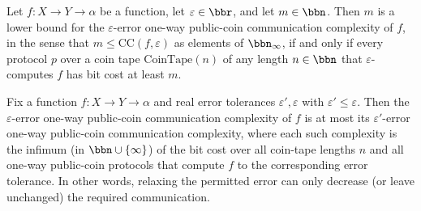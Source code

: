 \begin{theorem}
\label{CommunicationComplexity.PublicCoin.OneWay.le_communicationComplexity_iff}
\leanok
{}
Let $f : X \to Y \to \alpha$ be a function, let $\varepsilon \in \bbr$, and let $m \in
\bbn$. Then $m$ is a lower bound for the $\varepsilon$-error one-way public-coin
communication complexity of $f$, in the sense that $m \le \mathrm{CC}(f,\varepsilon)$ as
elements of $\bbn_\infty$, if and only if every protocol $p$ over a coin tape
$\mathrm{CoinTape}(n)$ of any length $n \in \bbn$ that $\varepsilon$-computes $f$ has
bit cost at least $m$.
\end{theorem}

\begin{theorem}
\label{CommunicationComplexity.PublicCoin.OneWay.communicationComplexity_mono}
\leanok
{}
Fix a function $f : X \to Y \to \alpha$ and real error tolerances $\varepsilon',
\varepsilon$ with $\varepsilon' \le \varepsilon$. Then the $\varepsilon$-error one-way
public-coin communication complexity of $f$ is at most its $\varepsilon'$-error one-way
public-coin communication complexity, where each such complexity is the infimum (in
$\bbn \cup \{\infty\}$) of the bit cost over all coin-tape lengths $n$ and all one-way
public-coin protocols that compute $f$ to the corresponding error tolerance. In other
words, relaxing the permitted error can only decrease (or leave unchanged) the required
communication.
\end{theorem}
